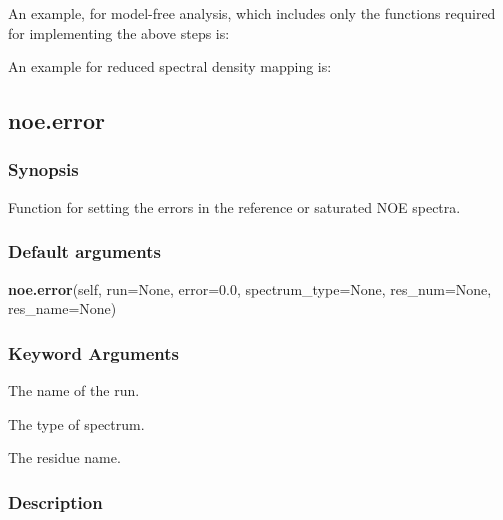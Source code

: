 An example, for model-free analysis, which includes only the functions required for
implementing the above steps is:




An example for reduced spectral density mapping is:





\newpage

\subsection{noe.error}


\subsubsection{Synopsis}

Function for setting the errors in the reference or saturated NOE spectra.

\subsubsection{Default arguments}

\textsf{\textbf{noe.error}(self, run=None, error=0.0, spectrum\_type=None, res\_num=None, res\_name=None)}


\subsubsection{Keyword Arguments}

  The name of the run.

  The type of spectrum.

  The residue name.

\subsubsection{Description}

